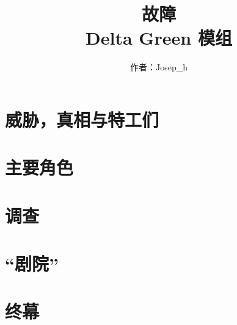 \documentclass[letterpaper,twocolumn,nodeprecatedcode, oneside, AutoFakeBold, 10pt]{dndbook}
\title{\Huge 故障 \\
\Large Delta Green 模组}
\author{作者：Josep\_h}
\date{}
\begin{document}


% 





\mainmatter

\chapter{威胁，真相与特工们}





% 

\chapter{主要角色}

% 

\chapter{调查}
% 
% 












\chapter{“剧院”}


\chapter{终幕}


\appendix







% 
\end{document}
